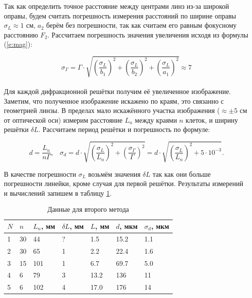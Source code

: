 \documentclass[a4paper,12pt]{article} %
\begin{document}
\noindent Так как определить точное расстояние между центрами линз из-за широкой оправы, будем считать погрешность измерения расстояний по ширине оправы $\sigma_L \approx 1$ см, $a_2$ берём без погрешности, так как считаем его равным фокусному расстоянию $F_2$. Рассчитаем погрешность значения увеличения исходя из формулы (\ref{e:mag}):

\[
\sigma_\Gamma = \Gamma \cdot \sqrt{\left( \frac{\sigma_L}{b_1} \right) ^ 2 + \left( \frac{\sigma_L}{b_2} \right) ^ 2 + \left( \frac{\sigma_L}{a_1} \right) ^ 2} \approx 7
\]

\paragraph{} Для каждой дифракционной решётки получим её увеличенное изображение. Заметим, что полученное изображение искажено по краям, это связанно с геометрией линзы. В пределах мало искажённого участка изображения ($\approx \pm 5$ см от оптической оси) измерим расстояние $L_n$ между краями $n$ клеток, и ширину решётки $\delta L$. Рассчитаем период решётки и погрешность по формуле:

\[
d = \frac{L_n}{n \Gamma}, \;\;\; \sigma_d = d \cdot \sqrt{\left( \frac{\sigma_L}{L_n} \right) ^ 2 + \left( \frac{\sigma_\Gamma}{\Gamma} \right) ^ 2 } = d \cdot \sqrt{\left( \frac{\sigma_L}{L_n} \right) ^ 2 + 5 \cdot 10^{-3} }.
\]

\noindent В качестве погрешности $\sigma_L$ возьмём значения $\delta L$ так как они больше погрешности линейки, кроме случая для первой решётки. Результаты измерений и вычислений запишем в таблицу \ref{tab:2met}.

\begin{table}[]
\centering
\begin{tabular}{|l|l|l|l|l|l|l|}
\hline
$N$ & $n$ & $L_n$, мм & $\delta L$,  мм & $L$, мм & $d$, мкм & $\sigma_d$, мкм \\ \hline
1   & 30  & 44        & ?              & 1.5     & 15.2     & 1.1             \\ \hline
2   & 30  & 65        & 1              & 2.2     & 22.4     & 1.6             \\ \hline
3   & 15  & 101       & 1              & 6.7     & 69.7     & 5.0             \\ \hline
4   & 6   & 79        & 3              & 13.2    & 136      & 11              \\ \hline
5   & 6   & 102       & 4              & 17.0    & 176      & 14              \\ \hline
\end{tabular}
\caption{Данные для второго метода}
\label{tab:2met}
\end{table}
\end{document}
